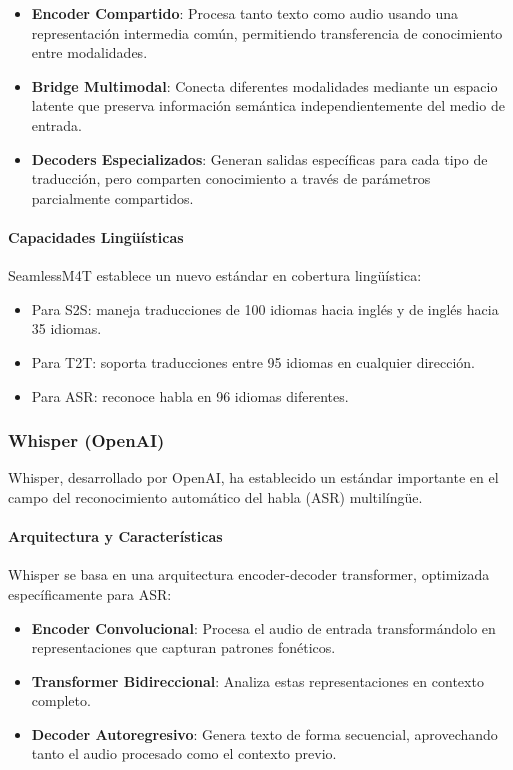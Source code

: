 \begin{itemize}
    \item \textbf{Encoder Compartido}: Procesa tanto texto como audio usando una representación intermedia común, permitiendo transferencia de conocimiento entre modalidades.
    
    \item \textbf{Bridge Multimodal}: Conecta diferentes modalidades mediante un espacio latente que preserva información semántica independientemente del medio de entrada.
    
    \item \textbf{Decoders Especializados}: Generan salidas específicas para cada tipo de traducción, pero comparten conocimiento a través de parámetros parcialmente compartidos.
\end{itemize}

\paragraph{Capacidades Lingüísticas}
SeamlessM4T establece un nuevo estándar en cobertura lingüística:

\begin{itemize}
    \item Para S2S: maneja traducciones de 100 idiomas hacia inglés y de inglés hacia 35 idiomas.
    \item Para T2T: soporta traducciones entre 95 idiomas en cualquier dirección.
    \item Para ASR: reconoce habla en 96 idiomas diferentes.
\end{itemize}

\subsubsection{Whisper (OpenAI)}
Whisper, desarrollado por OpenAI, ha establecido un estándar importante en el campo del reconocimiento automático del habla (ASR) multilíngüe.

\paragraph{Arquitectura y Características}
Whisper se basa en una arquitectura encoder-decoder transformer, optimizada específicamente para ASR:

\begin{itemize}
    \item \textbf{Encoder Convolucional}: Procesa el audio de entrada transformándolo en representaciones que capturan patrones fonéticos.
    
    \item \textbf{Transformer Bidireccional}: Analiza estas representaciones en contexto completo.
    
    \item \textbf{Decoder Autoregresivo}: Genera texto de forma secuencial, aprovechando tanto el audio procesado como el contexto previo.
\end{itemize}

